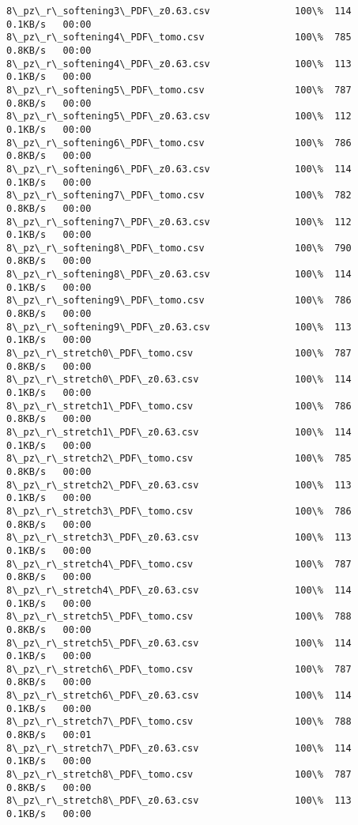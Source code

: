\documentclass[11pt]{article}
\begin{document}
\begin{Verbatim}[commandchars=\\\{\}]
8\_pz\_r\_softening3\_PDF\_z0.63.csv               100\%  114     0.1KB/s   00:00    
8\_pz\_r\_softening4\_PDF\_tomo.csv                100\%  785     0.8KB/s   00:00    
8\_pz\_r\_softening4\_PDF\_z0.63.csv               100\%  113     0.1KB/s   00:00    
8\_pz\_r\_softening5\_PDF\_tomo.csv                100\%  787     0.8KB/s   00:00    
8\_pz\_r\_softening5\_PDF\_z0.63.csv               100\%  112     0.1KB/s   00:00    
8\_pz\_r\_softening6\_PDF\_tomo.csv                100\%  786     0.8KB/s   00:00    
8\_pz\_r\_softening6\_PDF\_z0.63.csv               100\%  114     0.1KB/s   00:00    
8\_pz\_r\_softening7\_PDF\_tomo.csv                100\%  782     0.8KB/s   00:00    
8\_pz\_r\_softening7\_PDF\_z0.63.csv               100\%  112     0.1KB/s   00:00    
8\_pz\_r\_softening8\_PDF\_tomo.csv                100\%  790     0.8KB/s   00:00    
8\_pz\_r\_softening8\_PDF\_z0.63.csv               100\%  114     0.1KB/s   00:00    
8\_pz\_r\_softening9\_PDF\_tomo.csv                100\%  786     0.8KB/s   00:00    
8\_pz\_r\_softening9\_PDF\_z0.63.csv               100\%  113     0.1KB/s   00:00    
8\_pz\_r\_stretch0\_PDF\_tomo.csv                  100\%  787     0.8KB/s   00:00    
8\_pz\_r\_stretch0\_PDF\_z0.63.csv                 100\%  114     0.1KB/s   00:00    
8\_pz\_r\_stretch1\_PDF\_tomo.csv                  100\%  786     0.8KB/s   00:00    
8\_pz\_r\_stretch1\_PDF\_z0.63.csv                 100\%  114     0.1KB/s   00:00    
8\_pz\_r\_stretch2\_PDF\_tomo.csv                  100\%  785     0.8KB/s   00:00    
8\_pz\_r\_stretch2\_PDF\_z0.63.csv                 100\%  113     0.1KB/s   00:00    
8\_pz\_r\_stretch3\_PDF\_tomo.csv                  100\%  786     0.8KB/s   00:00    
8\_pz\_r\_stretch3\_PDF\_z0.63.csv                 100\%  113     0.1KB/s   00:00    
8\_pz\_r\_stretch4\_PDF\_tomo.csv                  100\%  787     0.8KB/s   00:00    
8\_pz\_r\_stretch4\_PDF\_z0.63.csv                 100\%  114     0.1KB/s   00:00    
8\_pz\_r\_stretch5\_PDF\_tomo.csv                  100\%  788     0.8KB/s   00:00    
8\_pz\_r\_stretch5\_PDF\_z0.63.csv                 100\%  114     0.1KB/s   00:00    
8\_pz\_r\_stretch6\_PDF\_tomo.csv                  100\%  787     0.8KB/s   00:00    
8\_pz\_r\_stretch6\_PDF\_z0.63.csv                 100\%  114     0.1KB/s   00:00    
8\_pz\_r\_stretch7\_PDF\_tomo.csv                  100\%  788     0.8KB/s   00:01    
8\_pz\_r\_stretch7\_PDF\_z0.63.csv                 100\%  114     0.1KB/s   00:00    
8\_pz\_r\_stretch8\_PDF\_tomo.csv                  100\%  787     0.8KB/s   00:00    
8\_pz\_r\_stretch8\_PDF\_z0.63.csv                 100\%  113     0.1KB/s   00:00    

\end{Verbatim}
\end{document}
